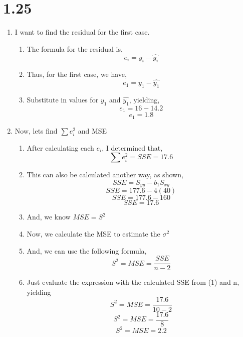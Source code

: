\documentclass{article}
\begin{document}
\section*{1.25}
	\begin{enumerate}[label = \alph*)]
		\item I want to find the residual for the first case.
		\begin{enumerate}[label = \arabic*)]
			\item The formula for the residual is,
				\[e_i = y_i - \hat{y_i}\]
			\item Thus, for the first case, we have,
				\[e_1 = y_1 - \hat{y_1}\]
			\item Substitute in values for $y_1$ and $\hat{y_1}$, yielding,
				\[e_1 = 16 - 14.2\]
				\[e_1 = 1.8\]
		\end{enumerate}
		\item Now, lets find $\sum e_i^2$ and MSE
			\begin{enumerate}[label = \arabic*)]
				\item After calculating each $e_i$, I determined that,
					\[\sum e_i^2 = SSE = 17.6\]
				\item This can also be calculated another way, as shown,
					\[SSE = S_{yy} - b_1S_{xy}\]
					\[SSE = 177.6 - 4(40)\]
					\[SSE = 177.6 - 160\]
					\[SSE = 17.6\]
				\item And, we know $MSE = S^2$
				\item Now, we calculate the MSE to estimate the $\sigma^2$
				\item And, we can use the following formula,
					\[S^2 = MSE = \frac{SSE}{n-2}\]
				\item Just evaluate the expression with the calculated SSE from (1) and n, yielding
				 	\[S^2 = MSE = \frac{17.6}{10-2}\]
				 	\[S^2 = MSE = \frac{17.6}{8}\]
				 	\[S^2 = MSE = 2.2\]
			\end{enumerate}
	\end{enumerate}
\end{document}
